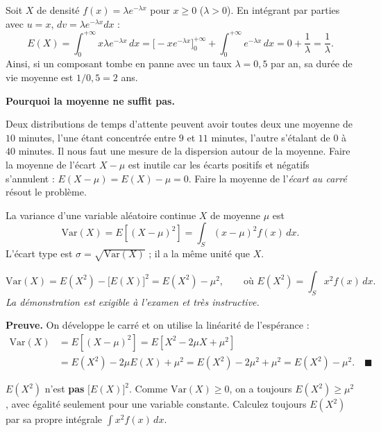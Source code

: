 \documentclass[11pt]{article}
\newcommand{\cle}[1]{{\popxbold\color{popdark}#1}}
\newcounter{popsec}
\newcounter{popsub}
\newcommand{\courssub}[1]{%
  \stepcounter{popsub}%
  \par\vspace{9pt}\noindent{\popxbold\fontsize{11.5}{13}\selectfont\color{popink}{\color{poporange}\thepopsec.\thepopsub}\hspace{6pt}#1}\par\nopagebreak\vspace{4pt}
}
\begin{document}
\begin{exemplebox}
Soit $X$ de densité $f(x)=\lambda e^{-\lambda x}$ pour $x\ge 0$ ($\lambda>0$). En intégrant par parties avec $u=x$, $dv=\lambda e^{-\lambda x}dx$ :
\[ E(X)=\int_0^{+\infty} x\lambda e^{-\lambda x}\,dx=\Big[-x e^{-\lambda x}\Big]_0^{+\infty}+\int_0^{+\infty} e^{-\lambda x}\,dx=0+\frac{1}{\lambda}=\frac{1}{\lambda}. \]
Ainsi, si un composant tombe en panne avec un taux $\lambda=0,5$ par an, sa durée de vie moyenne est $1/0,5=2$ ans.
\end{exemplebox}

\courssub{La variance $\mathrm{Var}(X)$}

\textbf{Pourquoi la moyenne ne suffit pas.}\par
Deux distributions de temps d'attente peuvent avoir toutes deux une moyenne de $10$ minutes, l'une étant concentrée entre $9$ et $11$ minutes, l'autre s'étalant de $0$ à $40$ minutes. Il nous faut une mesure de la \cle{dispersion} autour de la moyenne. Faire la moyenne de l'écart $X-\mu$ est inutile car les écarts positifs et négatifs s'annulent : $E(X-\mu)=E(X)-\mu=0$. Faire la moyenne de l'\emph{écart au carré} résout le problème.

\begin{definition}
La \cle{variance} d'une variable aléatoire continue $X$ de moyenne $\mu$ est
\[ \mathrm{Var}(X)=E\!\left[(X-\mu)^2\right]=\int_S (x-\mu)^2 f(x)\,dx . \]
L'\cle{écart type} est $\sigma=\sqrt{\mathrm{Var}(X)}$ ; il a la même unité que $X$.
\end{definition}

\begin{propriete}
\[ \mathrm{Var}(X)=E(X^2)-\big[E(X)\big]^2=E(X^2)-\mu^2, \qquad\text{où } E(X^2)=\int_S x^2 f(x)\,dx . \]
\emph{La démonstration est exigible à l'examen et très instructive.}
\end{propriete}

\textbf{Preuve.} On développe le carré et on utilise la linéarité de l'espérance :
\begin{align*}
\mathrm{Var}(X)&=E\!\left[(X-\mu)^2\right]=E\!\left[X^2-2\mu X+\mu^2\right]\\
&=E(X^2)-2\mu E(X)+\mu^2 = E(X^2)-2\mu^2+\mu^2 = E(X^2)-\mu^2. \quad\blacksquare
\end{align*}

\begin{attention}
$E(X^2)$ n'est \textbf{pas} $\big[E(X)\big]^2$. Comme $\mathrm{Var}(X)\ge 0$, on a toujours $E(X^2)\ge \mu^2$, avec égalité seulement pour une variable constante. Calculez toujours $E(X^2)$ par sa propre intégrale $\int x^2 f(x)\,dx$.
\end{attention}
\end{document}
